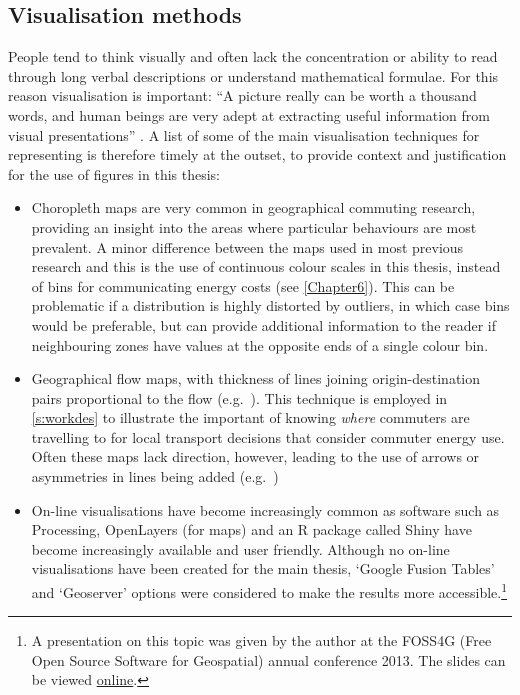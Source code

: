 \documentclass[a4paper, 11pt, twoside]{Thesis}
\begin{document}
\subsection{Visualisation methods}
People tend to think visually and often lack the concentration or ability
to read through long verbal descriptions or understand mathematical formulae.
For this reason visualisation is important:
``A picture really can be worth a thousand words, and human beings are very adept
at extracting useful information from visual presentations'' \citep[p.~4]{kabacoff2011r}.
A list of some of the main visualisation techniques for representing
is therefore timely at the outset, to provide context and justification
for the use of figures in this thesis:
\begin{itemize}
 \item Choropleth maps are very common in geographical commuting research,
 providing an insight into the areas where particular behaviours are most
 prevalent. A minor difference between the maps used in most previous
 research and this is the use of continuous colour scales in this thesis,
 instead of bins for communicating energy costs (see \cref{Chapter6}).
 This can be problematic if a distribution is highly
 distorted by outliers, in which case bins would be preferable, but can provide
 additional information to the reader if neighbouring zones have values at the
 opposite ends of a single colour bin.
 \item Geographical flow maps, with thickness of lines joining origin-destination
 pairs proportional to the flow (e.g.~\citealp{Smith2009}).
 This technique is employed in \cref{s:workdes} to illustrate the important of
 knowing \emph{where} commuters are travelling to for local transport decisions
 that consider commuter energy use. Often these maps lack direction, however,
 leading to the use of arrows or asymmetries in lines being added
 (e.g.~\citep{Nielsen2008})
 \item On-line visualisations have become increasingly common as software such
 as Processing, OpenLayers (for maps) and an R package called Shiny have become
 increasingly available and user friendly. Although no on-line visualisations
 have been created for the main thesis, `Google Fusion Tables' and `Geoserver'
 options were considered to make the results more
 accessible.\footnote{A presentation
 on this topic was given by the author at the FOSS4G (Free Open Source
 Software for Geospatial) annual conference 2013.
 The slides can be viewed
 {\color{blue} \href{http://robinlovelace.net/visualisation/open\%20source/conferences/presentation/2013/09/22/foss4g-presentation.html}
 {online}}.
 }
\end{itemize}
\end{document}
